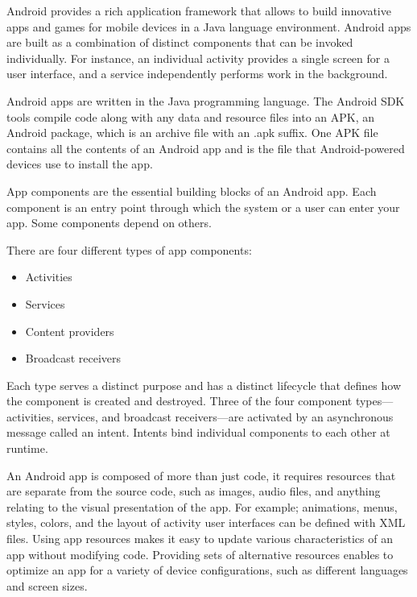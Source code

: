Android provides a rich application framework that allows to build innovative apps and games for mobile devices in a Java language environment. Android apps are built as a combination of distinct components that can be invoked individually. For instance, an individual activity provides a single screen for a user interface, and a service independently performs work in the background.

Android apps are written in the Java programming language. The Android SDK tools compile code along with any data and resource files into an APK, an Android package, which is an archive file with an .apk suffix. One APK file contains all the contents of an Android app and is the file that Android-powered devices use to install the app.

App components are the essential building blocks of an Android app. Each component is an entry point through which the system or a user can enter your app. Some components depend on others.

There are four different types of app components:
\begin{itemize}
\item Activities
\item Services
\item Content providers
\item Broadcast receivers
\end{itemize}

Each type serves a distinct purpose and has a distinct lifecycle that defines how the component is created and destroyed. Three of the four component types—activities, services, and broadcast receivers—are activated by an asynchronous message called an intent. Intents bind individual components to each other at runtime. 

An Android app is composed of more than just code, it requires resources that are separate from the source code, such as images, audio files, and anything relating to the visual presentation of the app. For example; animations, menus, styles, colors, and the layout of activity user interfaces can be defined with XML files. Using app resources makes it easy to update various characteristics of an app without modifying code. Providing sets of alternative resources enables to optimize an app for a variety of device configurations, such as different languages and screen sizes. \cite{android-developer}
